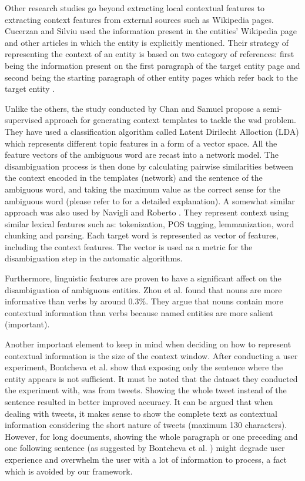 Other research studies go beyond extracting local contextual features to extracting context features from external sources such as Wikipedia pages. Cucerzan and Silviu \cite{24} used the information present in the entities' Wikipedia page and other articles in which the entity is explicitly mentioned. Their strategy of representing the context of an entity is based on two category of references: first being the information present on the first paragraph of the target entity page and second being the starting paragraph of other entity pages which refer back to the target entity \cite{24}. 

Unlike the others, the study conducted by Chan and Samuel \cite{29} propose a semi-supervised approach for generating context templates to tackle the \ac{wsd} problem. They have used a classification algorithm called Latent Dirilecht Alloction (LDA) which represents different topic features in a form of a vector space. All the feature vectors of the ambiguous word are recast into a network model. The disambiguation process is then done by calculating pairwise similarities between the context encoded in the templates (network) and the sentence of the ambiguous word, and taking the maximum value as the correct sense for the ambiguous word (please refer to \cite{29} for a detailed explanation). A somewhat similar approach was also used by Navigli and Roberto \cite{30}. They represent context using similar lexical features such as: tokenization, POS tagging, lemmanization, word chunking and parsing. Each target word is represented as vector of features, including the context features. The vector is used as a metric for the disambiguation step in the automatic algorithms. 

Furthermore, linguistic features are proven to have a significant affect on the disambiguation of ambiguous entities. Zhou et al. \cite{38} found that nouns are more informative than verbs by around 0.3\%. They argue that nouns contain more contextual information than verbs because named entities are more salient (important).

Another important element to keep in mind when deciding on how to represent contextual information is the size of the context window. After conducting a user experiment, Bontcheva et al. \cite{33} show that exposing only the sentence where the entity appears is not sufficient. It must be noted that the dataset they conducted the experiment with, was from tweets. Showing the whole tweet instead of the sentence resulted in better improved accuracy. It can be argued that when dealing with tweets, it makes sense to show the complete text as contextual information considering the short nature of tweets (maximum 130 characters). However, for long documents, showing the whole paragraph or one preceding and one following sentence (as suggested by Bontcheva et al. \cite{33}) might degrade user experience and overwhelm the user with a lot of information to process, a fact which is avoided by our framework.
\newpage